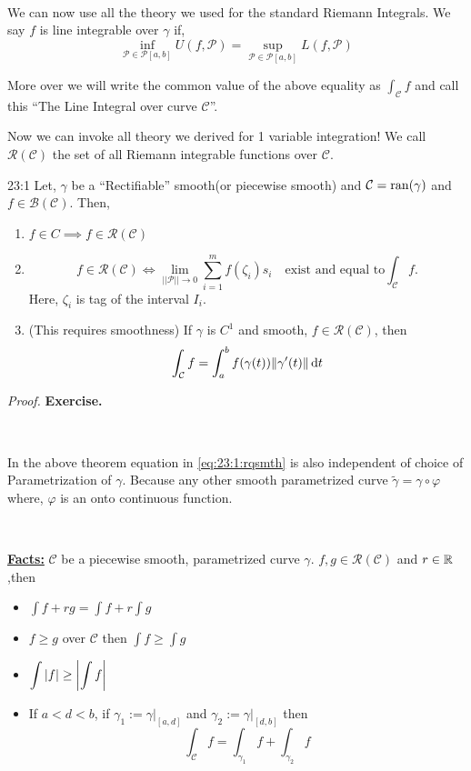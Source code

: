 \documentclass[../Analysis-3.tex]{subfiles}
\begin{document}
\

We can now use all the theory we used for the standard Riemann Integrals. We say $f$ is line integrable over $\gamma$ if,
\[\inf_{\mathcal{P} \in \mathscr{P}[a,b]} U(f,\mathcal{P}) = \sup_{\mathcal{P} \in \mathscr{P}[a,b]} L(f,\mathcal{P})\]

More over we will write the common value of the above equality as $\displaystyle\int_{\mathcal{C}} f$ and call this ``The Line Integral over curve $\mathcal{C}$''.

Now we can invoke all theory we derived for 1 variable integration! We call $\mathscr{R}(\mathcal{C}) $ the set of all Riemann integrable functions over $\mathcal{C}$.

\begin{Thm}{}{23:1}
  Let, $\gamma$ be a ``Rectifiable'' smooth(or piecewise smooth) and $\mathcal{C} = \operatorname{ran}(\gamma)$ and $f \in \mathscr{B}(\mathcal{C})$. Then,
  \begin{enumerate}
    \item $f \in C \implies f \in \mathscr{R}(\mathcal{C})$
    \item \[ f \in \mathscr{R}(\mathcal{C}) \iff \lim_{||\mathcal{P}||\to 0} \sum_{i=1}^{m} f(\zeta_i)s_i \quad \text{exist and equal to}\int_{\mathcal{C}} f.\] Here, $\zeta_i$ is tag of the interval $I_i$.

    \item (This requires smoothness) If $\gamma$ is $C^1$ and smooth, $f \in \mathscr{R}(\mathcal{C})$, then
          \[\int_{\mathcal{C}} f = \int_a^b f(\gamma(t))\norm{\gamma'(t)} \, \dd t \label{eq:23:1:rqsmth}\]

  \end{enumerate}
\end{Thm}

\textit{Proof.} \textbf{Exercise.}

\

In the above theorem equation in \ref{eq:23:1:rqsmth} is also independent of choice of Parametrization of $\gamma$. Because any other smooth parametrized curve $\tilde{\gamma} = \gamma \circ \varphi$ where, $\varphi$ is an onto continuous function.

\

\textbf{\underline{Facts:}} $\mathcal{C}$ be a piecewise smooth, parametrized curve $\gamma$. $f,g \in \mathscr{R}(\mathcal{C})$ and $r \in \mathbb{R}$,then
\begin{itemize}
  \item $\displaystyle\int f+rg = \displaystyle\int f + r\displaystyle\int g $
  \item $f \ge g$ over $\mathcal{C}$ then $\displaystyle\int f \ge \displaystyle\int g$
  \item $\displaystyle\int \abs{f} \ge \abs{\displaystyle\int f}$
  \item If $a<d<b$, if $\gamma_1 := \gamma |_{[a,d]}$ and $\gamma_2 := \gamma |_{[d,b]}$ then
        \[\int_{\mathcal{C}} f = \int_{\gamma_1}f + \int_{\gamma_2} f \]
\end{itemize}
\end{document}
